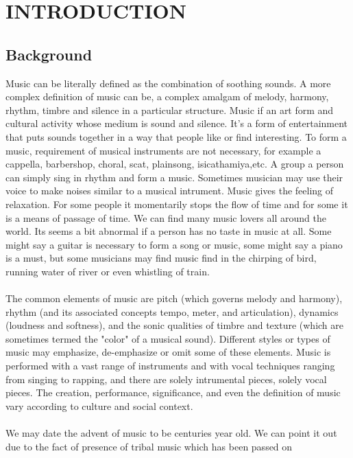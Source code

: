 \newpage
\section{INTRODUCTION}

\subsection{Background}

Music can be literally defined as the combination of soothing sounds. A more complex definition of music can be, a complex amalgam of 
melody, harmony, rhythm, timbre and silence in a particular structure. Music if an art form and cultural activity whose medium is sound and silence. It's a 
form of entertainment that puts sounds together in a way that people like or find interesting. To form a music, requirement of musical instruments are not necessary,
for example a cappella, barbershop, choral, scat, plainsong, isicathamiya,etc.
A group a person can simply sing in rhythm and form a music. Sometimes musician may use their voice to make noises similar to a musical intrument.
Music gives the feeling of relaxation. For some people it momentarily stops the flow of time and
for some it is a means of passage of time. We can find many music lovers all around the world. Its seems a bit abnormal if a person has no taste in
music at all. Some might say a guitar is necessary to form a song or music, some might say a piano is a must, but some musicians may find music
find in the chirping of bird, running water of river or even whistling of train.\\ 
\\
The common elements of music are pitch (which governs melody and harmony), rhythm (and its associated concepts tempo, meter, and articulation),
dynamics (loudness and softness), and the sonic qualities of timbre and texture (which are sometimes termed the "color" of a musical sound). Different styles
or types of music may emphasize, de-emphasize or omit some of these elements. Music is performed with a vast range of instruments and with 
vocal techniques ranging from singing to rapping, and there are solely intrumental pieces, solely vocal pieces. The creation, performance, significance,
and even the definition of music vary according to culture and social context.\\
\\
We may date the advent of music to be centuries year old. We can point it out due to the fact of presence of tribal music which has been passed on
